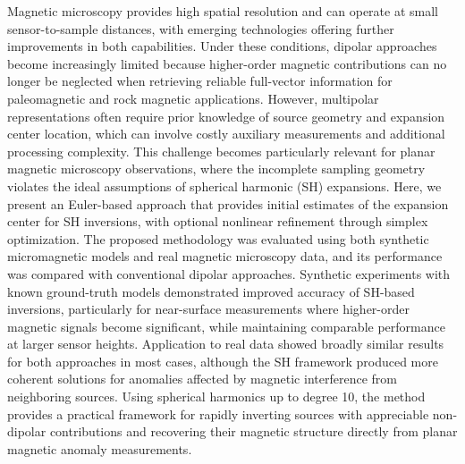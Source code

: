 Magnetic microscopy provides high spatial resolution and can operate at small sensor-to-sample distances, with emerging technologies offering further improvements in both capabilities. Under these conditions, dipolar approaches become increasingly limited because higher-order magnetic contributions can no longer be neglected when retrieving reliable full-vector information for paleomagnetic and rock magnetic applications. However, multipolar representations often require prior knowledge of source geometry and expansion center location, which can involve costly auxiliary measurements and additional processing complexity. This challenge becomes particularly relevant for planar magnetic microscopy observations, where the incomplete sampling geometry violates the ideal assumptions of spherical harmonic (SH) expansions. Here, we present an Euler-based approach that provides initial estimates of the expansion center for SH inversions, with optional nonlinear refinement through simplex optimization. The proposed methodology was evaluated using both synthetic micromagnetic models and real magnetic microscopy data, and its performance was compared with conventional dipolar approaches. Synthetic experiments with known ground-truth models demonstrated improved accuracy of SH-based inversions, particularly for near-surface measurements where higher-order magnetic signals become significant, while maintaining comparable performance at larger sensor heights. Application to real data showed broadly similar results for both approaches in most cases, although the SH framework produced more coherent solutions for anomalies affected by magnetic interference from neighboring sources. Using spherical harmonics up to degree 10, the method provides a practical framework for rapidly inverting sources with appreciable non-dipolar contributions and recovering their magnetic structure directly from planar magnetic anomaly measurements.
